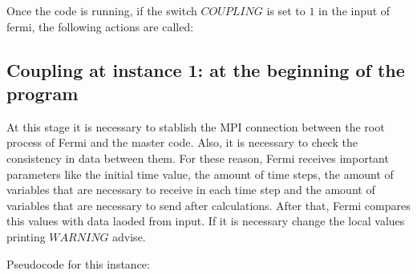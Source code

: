 Once the code is running, if the switch $COUPLING$ is set to $1$ in the input of fermi, the following actions are called:

\subsection*{Coupling at instance 1: at the beginning of the program}
At this stage it is necessary to stablish the MPI connection between the root process of Fermi and the master code.
Also, it is necessary to check the consistency in data between them.
For these reason, Fermi receives important parameters like the initial time value, 
the amount of time steps, the amount of variables that are necessary to receive in each time step and the amount of variables that are necessary to send after calculations.
After that, Fermi compares this values with data laoded from input.
If it is necessary change the local values printing $WARNING$ advise.

Pseudocode for this instance:

